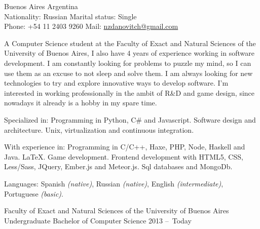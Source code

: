 \documentclass[10pt,a4paper]{article}
\begin{document}
\sloppy



\nobreakvspace{0.3em}

\noindent
Buenos Aires \sbull
Argentina \\
Nationality: Russian \sbull
Marital status: Single \\
Phone: +54 11 2403 9260 \sbull
Mail: \href{mailto:nzdanovitch.at.gmail.dot.com}{nzdanovitch\mbox{}@\mbox{}gmail.com}

\spacedhrule{1.2em}{-0.4em}




\vspace{-1.3em}
\begin{multicols}{2}
\noindent
A Computer Science student at the Faculty of Exact and Natural Sciences of the University of Buenos Aires, I also have 4 years of experience working in software development.
I am constantly looking for problems to puzzle my mind, so I can use them as an excuse to not sleep and solve them.
I am always looking for new technologies to try and explore innovative ways to develop software.
I'm interested in working professionally in the ambit of R\&D and game design, since nowadays it already is a hobby in my spare time.
\end{multicols}

\spacedhrule{0.3em}{-0.4em}




\inlineheadsection
  {Specialized in:}
  {Programming in Python, C\# and Javascript. Software design and architecture. Unix, virtualization and continuous integration.}

\inlineheadsection
  {With experience in:}
  {Programming in C/C++, Haxe, PHP, Node, Haskell and Java. \LaTeX. Game development. Frontend development with HTML5, CSS, Less/Sass, JQuery, Ember.js and Meteor.js. Sql databases and MongoDb.}

  \vspace{0.5em}
\inlineheadsection
  {Languages:}
  {Spanish \emph{(native)}, Russian \emph{(native)}, English \emph{(intermediate)}, Portuguese \emph{(basic)}.}

\spacedhrule{1.9em}{-0.4em}




\vspace{0.2em}
\headedsection
  {Faculty of Exact and Natural Sciences of the University of Buenos Aires}
  {\textsc{}} {%
  \headedsubsection
    {Undergraduate Bachelor of Computer Science}
    {2013 --\ Today \ }{}
}
\end{document}
